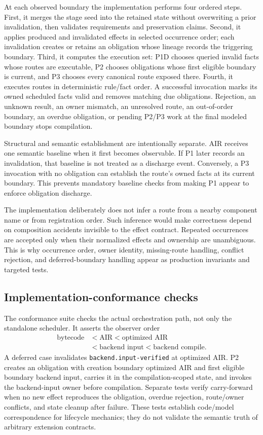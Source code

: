At each observed boundary the implementation performs four ordered steps. First, it merges the stage seed into the retained state without overwriting a prior invalidation, then validates requirements and preservation claims. Second, it applies produced and invalidated effects in selected occurrence order; each invalidation creates or retains an obligation whose lineage records the triggering boundary. Third, it computes the execution set: P1D chooses queried invalid facts whose routes are executable, P2 chooses obligations whose first eligible boundary is current, and P3 chooses every canonical route exposed there. Fourth, it executes routes in deterministic rule/fact order. A successful invocation marks its owned scheduled facts valid and removes matching due obligations. Rejection, an unknown result, an owner mismatch, an unresolved route, an out-of-order boundary, an overdue obligation, or pending P2/P3 work at the final modeled boundary stops compilation.

Structural and semantic establishment are intentionally separate. AIR receives one semantic baseline when it first becomes observable. If P1 later records an invalidation, that baseline is not treated as a discharge event. Conversely, a P3 invocation with no obligation can establish the route's owned facts at its current boundary. This prevents mandatory baseline checks from making P1 appear to enforce obligation discharge.

The implementation deliberately does not infer a route from a nearby component name or from registration order. Such inference would make correctness depend on composition accidents invisible to the effect contract. Repeated occurrences are accepted only when their normalized effects and ownership are unambiguous. This is why occurrence order, owner identity, missing-route handling, conflict rejection, and deferred-boundary handling appear as production invariants and targeted tests.

\subsection{Implementation-conformance checks}
The conformance suite checks the actual orchestration path, not only the standalone scheduler. It asserts the observer order
\[
\begin{aligned}
\text{bytecode}&<\text{AIR}<\text{optimized AIR}\\
&<\text{backend input}<\text{backend compile}.
\end{aligned}
\]
A deferred case invalidates \texttt{backend.input-verified} at optimized AIR. P2 creates an obligation with creation boundary optimized AIR and first eligible boundary backend input, carries it in the compilation-scoped state, and invokes the backend-input owner before compilation. Separate tests verify carry-forward when no new effect reproduces the obligation, overdue rejection, route/owner conflicts, and state cleanup after failure. These tests establish code/model correspondence for lifecycle mechanics; they do not validate the semantic truth of arbitrary extension contracts.

